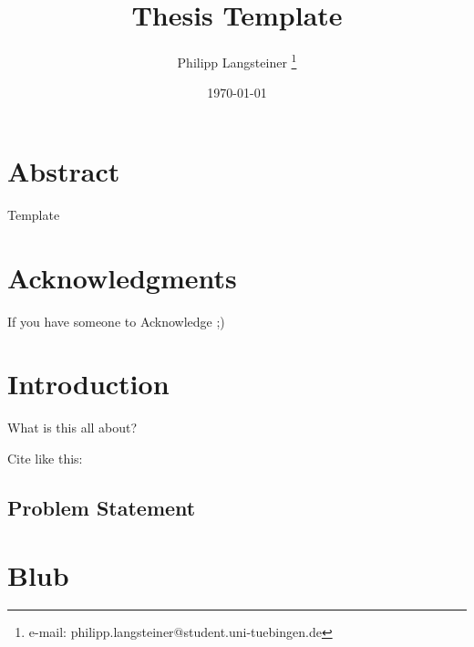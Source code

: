 \documentclass[a4paper,cleardoublepage=empty,BCOR=1cm,parskip=half-]{scrbook}
\title{Thesis Template}
\author{Philipp Langsteiner \thanks{e-mail: philipp.langsteiner@student.uni-tuebingen.de}}
\date{\today}
\begin{document}


\chapter*{Abstract}
Template

\chapter*{Acknowledgments}
If you have someone to Acknowledge ;)

\tableofcontents


\chapter{Introduction}
What is this all about?

Cite like this: \cite{agarwal2011}

\section{Problem Statement}

\Blinddocument



\appendix
\chapter{Blub}


\end{document}
